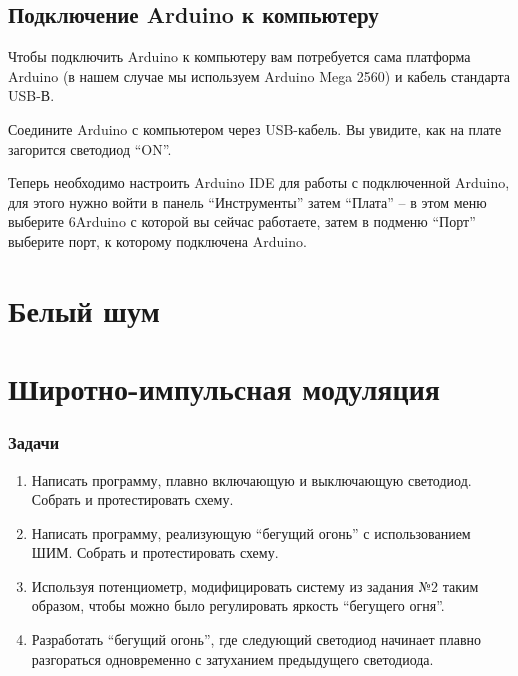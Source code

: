 \documentclass[a4paper,twoside]{book}
\begin{document}
\section{Подключение Arduino к компьютеру}
Чтобы подключить Arduino к компьютеру вам потребуется сама платформа Arduino (в
нашем случае мы используем Arduino Mega 2560) и кабель стандарта USB-В.

Соедините Arduino с компьютером через USB-кабель. Вы увидите, как на плате
загорится светодиод ``ON''.

Теперь необходимо настроить Arduino IDE для работы с подключенной Arduino, для
этого нужно войти в панель ``Инструменты'' затем ``Плата'' -- в этом меню
выберите 6Arduino с которой вы сейчас работаете, затем в подменю ``Порт''
выберите порт, к которому подключена Arduino.

\newpage








\chapter{Белый шум}







\chapter{Широтно-импульсная модуляция}






\subsection{Задачи}

\begin{enumerate}
\item Написать программу, плавно включающую и выключающую светодиод. Собрать и
  протестировать схему. 
\item Написать программу, реализующую ``бегущий огонь'' с использованием ШИМ.
  Собрать и протестировать схему.
\item Используя потенциометр, модифицировать систему из задания №2 таким
  образом, чтобы можно было регулировать яркость ``бегущего огня''.
\item Разработать ``бегущий огонь'', где следующий светодиод начинает плавно
  разгораться одновременно с затуханием предыдущего светодиода.
\end{enumerate}
\end{document}
